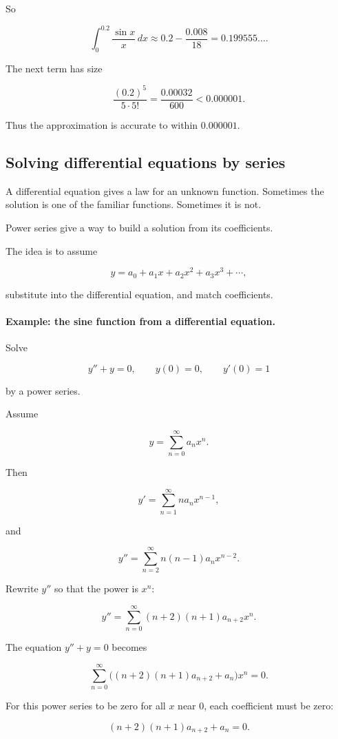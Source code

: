 So

\[
\int_0^{0.2}\frac{\sin x}{x}\,dx
\approx
0.2-\frac{0.008}{18}
=
0.199555\ldots.
\]

The next term has size

\[
\frac{(0.2)^5}{5\cdot 5!}
=
\frac{0.00032}{600}
<0.000001.
\]

Thus the approximation is accurate to within \(0.000001\).

\subsection{Solving differential equations by series}
\label{subsec:solving-differential-equations-series}

A differential equation gives a law for an unknown function.  Sometimes the solution is
one of the familiar functions.  Sometimes it is not.

Power series give a way to build a solution from its coefficients.

The idea is to assume

\[
y=a_0+a_1x+a_2x^2+a_3x^3+\cdots,
\]

substitute into the differential equation, and match coefficients.

\paragraph{Example: the sine function from a differential equation.}
Solve

\[
y''+y=0,
\qquad
y(0)=0,
\qquad
y'(0)=1
\]

by a power series.

Assume

\[
y=\sum_{n=0}^{\infty}a_nx^n.
\]

Then

\[
y'=\sum_{n=1}^{\infty}n a_n x^{n-1},
\]

and

\[
y''=\sum_{n=2}^{\infty}n(n-1)a_nx^{n-2}.
\]

Rewrite \(y''\) so that the power is \(x^n\):

\[
y''=
\sum_{n=0}^{\infty}
(n+2)(n+1)a_{n+2}x^n.
\]

The equation \(y''+y=0\) becomes

\[
\sum_{n=0}^{\infty}
\bigl((n+2)(n+1)a_{n+2}+a_n\bigr)x^n=0.
\]

For this power series to be zero for all \(x\) near \(0\), each coefficient must be zero:

\[
(n+2)(n+1)a_{n+2}+a_n=0.
\]

